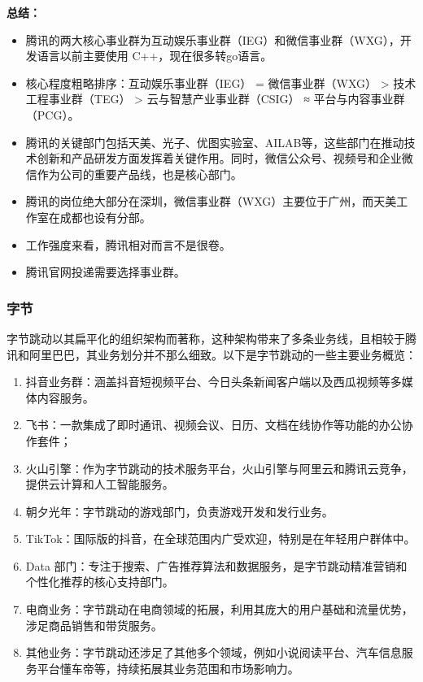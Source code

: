 \textbf{总结：}
\begin{itemize}
    \item 腾讯的两大核心事业群为互动娱乐事业群（IEG）和微信事业群（WXG），开发语言以前主要使用 C++，现在很多转go语言。
    \item 核心程度粗略排序：互动娱乐事业群（IEG） = 微信事业群（WXG） > 技术工程事业群（TEG） > 云与智慧产业事业群（CSIG） ≈ 平台与内容事业群（PCG）。
    \item 腾讯的关键部门包括天美、光子、优图实验室、AILAB等，这些部门在推动技术创新和产品研发方面发挥着关键作用。同时，微信公众号、视频号和企业微信作为公司的重要产品线，也是核心部门。
    \item 腾讯的岗位绝大部分在深圳，微信事业群（WXG）主要位于广州，而天美工作室在成都也设有分部。
    \item 工作强度来看，腾讯相对而言不是很卷。
    \item 腾讯官网投递需要选择事业群。
\end{itemize}

\subsubsection{字节}
字节跳动以其扁平化的组织架构而著称，这种架构带来了多条业务线，且相较于腾讯和阿里巴巴，其业务划分并不那么细致。以下是字节跳动的一些主要业务概览：

\begin{enumerate}
    \item 抖音业务群：涵盖抖音短视频平台、今日头条新闻客户端以及西瓜视频等多媒体内容服务。
    \item 飞书：一款集成了即时通讯、视频会议、日历、文档在线协作等功能的办公协作套件；
    \item 火山引擎：作为字节跳动的技术服务平台，火山引擎与阿里云和腾讯云竞争，提供云计算和人工智能服务。
    \item 朝夕光年：字节跳动的游戏部门，负责游戏开发和发行业务。
    \item TikTok：国际版的抖音，在全球范围内广受欢迎，特别是在年轻用户群体中。
    \item Data 部门：专注于搜索、广告推荐算法和数据服务，是字节跳动精准营销和个性化推荐的核心支持部门。
    \item 电商业务：字节跳动在电商领域的拓展，利用其庞大的用户基础和流量优势，涉足商品销售和带货服务。
    \item 其他业务：字节跳动还涉足了其他多个领域，例如小说阅读平台、汽车信息服务平台懂车帝等，持续拓展其业务范围和市场影响力。
\end{enumerate}

